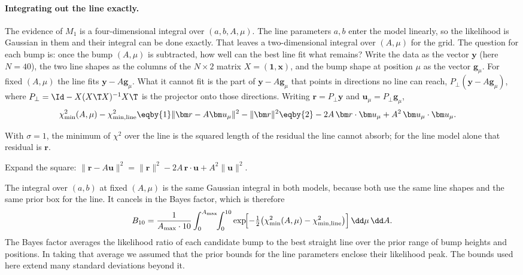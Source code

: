 \paragraph{Integrating out the line exactly.}
The evidence of $M_1$ is a four-dimensional integral over $(a,b,A,\mu)$. The line
parameters $a,b$ enter the model linearly, so the likelihood is Gaussian in them and
their integral can be done exactly. That leaves a two-dimensional integral over
$(A,\mu)$ for the grid. The question for each bump is: once the bump $(A,\mu)$ is
subtracted, how well can the best line fit what remains? Write the data as the vector
$\bm y$ (here $N=40$), the two line shapes as the columns of the $N\times2$ matrix
$X=(\bm1,\bm x)$, and the bump shape at position $\mu$ as the vector $\bm g_\mu$. For
fixed $(A,\mu)$ the line fits $\bm y-A\bm g_\mu$. What it cannot fit is the part of
$\bm y-A\bm g_\mu$ that points in directions no line can reach,
$P_\perp(\bm y-A\bm g_\mu)$, where $P_\perp=\Id-X(X\T X)^{-1}X\T$ is the projector onto
those directions. Writing $\bm r=P_\perp\bm y$ and $\bm u_\mu=P_\perp\bm g_\mu$,
\begin{align}
  \chi^2_{\min}(A,\mu)-\chi^2_{\min,\rm line}
  &\eqby{1}\lVert\bm r-A\bm u_\mu\rVert^2-\lVert\bm r\rVert^2
   \eqby{2}-2A\,\bm r\cdot\bm u_\mu+A^2\,\bm u_\mu\cdot\bm u_\mu .
  \label{5c:eq:dchi2}
\end{align}
\begin{explain}
  \item With $\sigma=1$, the minimum of $\chi^2$ over the line is the squared length of
        the residual the line cannot absorb; for the line model alone that residual is
        $\bm r$.
  \item Expand the square: $\lVert\bm r-A\bm u\rVert^2=\lVert\bm r\rVert^2-2A\,\bm r\cdot\bm u+A^2\lVert\bm u\rVert^2$.
\end{explain}
The integral over $(a,b)$ at fixed $(A,\mu)$ is the same Gaussian integral in both
models, because both use the same line shapes and the same prior box for the line. It
cancels in the Bayes factor, which is therefore
\begin{equation}
  B_{10}=\frac{1}{A_{\max}\cdot10}\int_0^{A_{\max}}\!\!\int_0^{10}
  \exp\!\Bigl[-\tfrac12\bigl(\chi^2_{\min}(A,\mu)-\chi^2_{\min,\rm line}\bigr)\Bigr]\,\dd\mu\,\dd A .
  \label{5c:eq:bump-bf}
\end{equation}
The Bayes factor averages the likelihood ratio of each candidate bump to the
best straight line over the prior range of bump heights and positions. In taking
that average we assumed that the prior bounds for the line parameters enclose
their likelihood peak. The bounds used here extend many standard deviations
beyond it.

